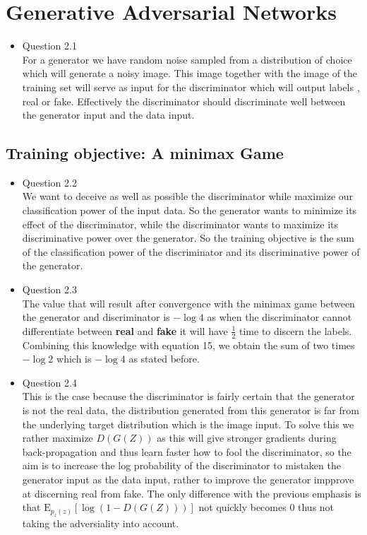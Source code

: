 \documentclass{article}
\begin{document}
\section{Generative Adversarial Networks}
    \begin{itemize}
      \item Question 2.1 \\
      For a generator we have random noise sampled from a distribution of choice which will generate a noisy image. This image together with the image of the training set will serve as input for the discriminator which will output labels , real or fake. Effectively the discriminator should discriminate well between the generator input and the data input. 
    \end{itemize}
    \subsection{Training objective: A minimax Game}
      \begin{itemize}
        \item Question 2.2 \\
        We want to deceive as well as possible the discriminator while maximize our classification power of the input data. So the generator wants to minimize its effect of the discriminator, while the discriminator wants to maximize its discriminative power over the generator. So the training objective is the sum of  the classification power of the discriminator and its discriminative power of the generator.
        \item Question 2.3 \\
        The value that will result after convergence with the minimax game between the generator and discriminator is  $-\log 4$ as when the discriminator cannot differentiate between \textbf{real} and \textbf{fake} it will have $\frac{1}{2} $ time to discern the labels. Combining this knowledge with equation 15, we obtain the sum of two times $-\log{2}$ which is $-\log{4}$ as stated before. 
        \item Question 2.4 \\
        This is the case because the discriminator is fairly certain that the generator is not the real data, the distribution generated from this generator is far from the underlying target distribution which is the image input. To solve this we rather maximize $D(G(Z))$ as this will give stronger gradients during back-propagation and thus learn faster how to fool the discriminator, so the aim is to increase the log probability of the discriminator to mistaken the generator input as the data input, rather to improve the generator impprove at discerning real from fake. The only difference with the previous emphasis is that $\mathrm{E}_{p_z(z)}\left[ \log \left( 1 - D(G(Z)) \right) \right]$ not quickly becomes $0$ thus not taking the adversiality into account. 
      \end{itemize}
\end{document}
